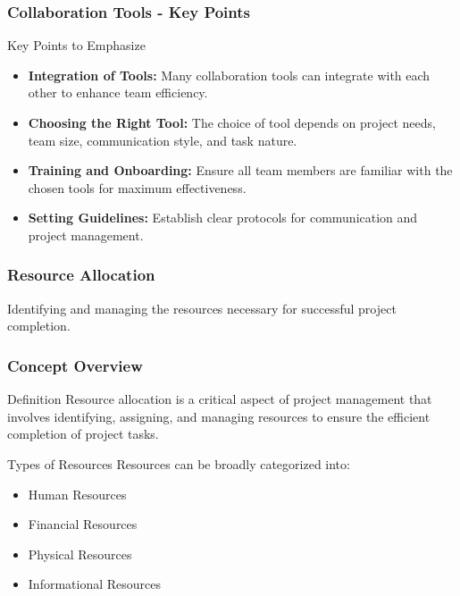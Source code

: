 \documentclass[aspectratio=169]{beamer}
\begin{document}
\begin{frame}[fragile]
    \frametitle{Collaboration Tools - Key Points}
    \begin{block}{Key Points to Emphasize}
        \begin{itemize}
            \item \textbf{Integration of Tools:} Many collaboration tools can integrate with each other to enhance team efficiency.
            \item \textbf{Choosing the Right Tool:} The choice of tool depends on project needs, team size, communication style, and task nature.
            \item \textbf{Training and Onboarding:} Ensure all team members are familiar with the chosen tools for maximum effectiveness.
            \item \textbf{Setting Guidelines:} Establish clear protocols for communication and project management.
        \end{itemize}
    \end{block}
\end{frame}

\begin{frame}[fragile]
    \frametitle{Resource Allocation}
    Identifying and managing the resources necessary for successful project completion.
\end{frame}

\begin{frame}[fragile]
    \frametitle{Concept Overview}
    \begin{block}{Definition}
        Resource allocation is a critical aspect of project management that involves identifying, assigning, and managing resources to ensure the efficient completion of project tasks.
    \end{block}
    
    \begin{block}{Types of Resources}
        Resources can be broadly categorized into:
        \begin{itemize}
            \item Human Resources
            \item Financial Resources
            \item Physical Resources
            \item Informational Resources
        \end{itemize}
    \end{block}
\end{frame}
\end{document}
